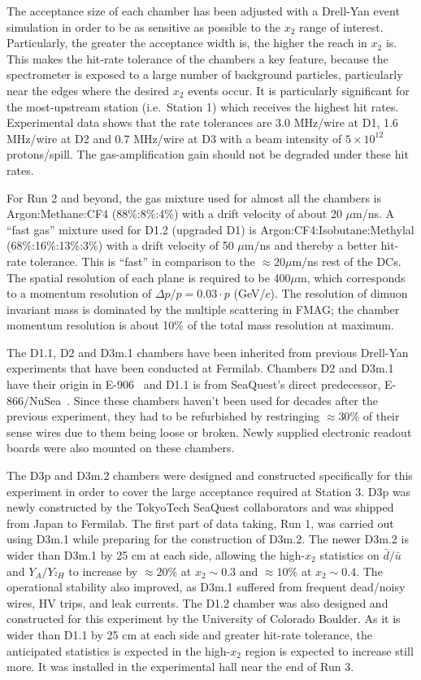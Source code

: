 The acceptance size of each chamber has been adjusted with a Drell-Yan event simulation in order to be as sensitive as possible to the $x_2$ range of interest. Particularly, the greater the acceptance width is, the higher the reach in $x_2$ is. This makes the hit-rate tolerance of the chambers a key feature, because the spectrometer is exposed to a large number of background particles, particularly near the edges where the desired $x_2$ events occur. It is particularly significant for the most-upstream station (i.e.~Station 1) which receives the highest hit rates. Experimental data shows that the rate tolerances are 3.0 MHz/wire at D1, 1.6 MHz/wire at D2 and 0.7 MHz/wire at D3 with a beam intensity of $5\times10^{12}$ protons/spill. The gas-amplification gain should not be degraded under these hit rates.

For Run 2 and beyond, the gas mixture used for almost all the chambers is Argon:Methane:CF4 (88\%:8\%:4\%) with a drift velocity of about 20 $\mu$m/ns. A ``fast gas'' mixture used for D1.2 (upgraded D1) is Argon:CF4:Isobutane:Methylal (68\%:16\%:13\%:3\%) with a drift velocity of 50 $\mu$m/ns and thereby a better hit-rate tolerance. This is ``fast'' in comparison to the $\approx20\mu$m/ns rest of the DCs. The spatial resolution of each plane is required to be 400$\mu$m, which corresponds to a momentum resolution of $\Delta p / p = 0.03 \cdot p$ (GeV/$c$). The resolution of dimuon invariant mass is dominated by the multiple scattering in FMAG; the chamber momentum resolution is about 10\% of the total mass resolution at maximum.

The D1.1, D2 and D3m.1 chambers have been inherited from previous Drell-Yan experiments that have been conducted at Fermilab.
Chambers D2 and D3m.1 have their origin in E-906~\cite{PhysRevD.43.2815} and D1.1 is from SeaQuest's direct predecessor, E-866/NuSea~\cite{PhysRevLett.80.3715, Towell:2001nh}. Since these chambers haven't been used for decades after the previous experiment, they had to be refurbished by restringing $\approx30\%$ of their sense wires due to them being loose or broken. Newly supplied electronic readout boards were also mounted on these chambers.

The D3p and D3m.2 chambers were designed and constructed specifically for this experiment in order to cover the large acceptance required at Station 3. D3p was newly constructed by the TokyoTech SeaQuest collaborators and was shipped from Japan to Fermilab. The first part of data taking, Run 1, was carried out using D3m.1 while preparing for the construction of D3m.2. The newer D3m.2 is wider than D3m.1 by 25 cm at each side, allowing the high-$x_2$ statistics on $\bar{d}/\bar{u}$ and $Y_A / Y_{^2H}$ to increase by $\approx20\%$ at $x_2 \sim 0.3$ and $\approx10\%$ at $x_2 \sim 0.4$. The operational stability also improved, as D3m.1 suffered from frequent dead/noisy wires, HV trips, and leak currents. The D1.2 chamber was also designed and constructed for this experiment by the University of Colorado Boulder. As it is wider than D1.1 by 25 cm at each side and greater hit-rate tolerance, the anticipated statistics is expected in the high-$x_2$ region is expected to increase still more. It was installed in the experimental hall near the end of Run 3.

